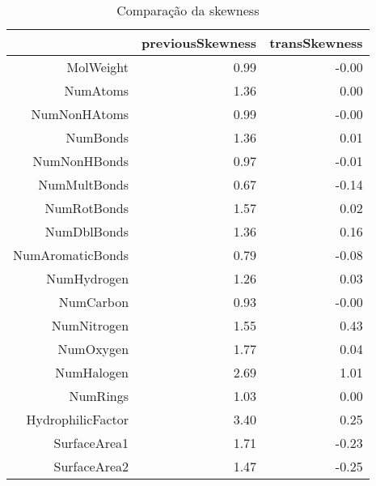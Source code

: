 \begin{table}[ht]
  \centering
  \caption{Comparação da skewness}
  \label{skewness}
  \begin{tabular}{rrr}
    \hline
    & previousSkewness & transSkewness \\ 
    \hline
    MolWeight & 0.99 & -0.00 \\ 
    NumAtoms & 1.36 & 0.00 \\ 
    NumNonHAtoms & 0.99 & -0.00 \\ 
    NumBonds & 1.36 & 0.01 \\ 
    NumNonHBonds & 0.97 & -0.01 \\ 
    NumMultBonds & 0.67 & -0.14 \\ 
    NumRotBonds & 1.57 & 0.02 \\ 
    NumDblBonds & 1.36 & 0.16 \\ 
    NumAromaticBonds & 0.79 & -0.08 \\ 
    NumHydrogen & 1.26 & 0.03 \\ 
    NumCarbon & 0.93 & -0.00 \\ 
    NumNitrogen & 1.55 & 0.43 \\ 
    NumOxygen & 1.77 & 0.04 \\ 
    NumHalogen & 2.69 & 1.01 \\ 
    NumRings & 1.03 & 0.00 \\ 
    HydrophilicFactor & 3.40 & 0.25 \\ 
    SurfaceArea1 & 1.71 & -0.23 \\ 
    SurfaceArea2 & 1.47 & -0.25 \\ 
    \hline
  \end{tabular}
\end{table}
